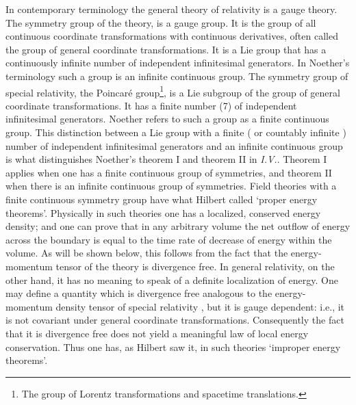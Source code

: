 \documentclass[12pt]{article}
\begin{document}
In contemporary terminology the general theory of relativity is a gauge theory.
The symmetry group of the theory, is a gauge group. It is the group of all continuous coordinate 
transformations with continuous derivatives,   often called
the group of general coordinate transformations. 
   It is a Lie group that has a continuously infinite number of independent infinitesimal generators. In Noether's terminology  such a group is an infinite continuous group.
The symmetry group of special relativity,  the Poincar\'{e} group\footnote{
The group of Lorentz transformations and spacetime translations.}, 
 is a Lie subgroup of the group of general coordinate transformations.  It
 has a finite number (7) of independent infinitesimal
generators. Noether refers to such a  group as a finite continuous group.
This distinction between a Lie group with a finite ( or countably infinite ) number of independent infinitesimal generators and an infinite continuous
group is what distinguishes Noether's theorem I and theorem II  in {\it{I.V.}}.
Theorem I applies when one has a finite continuous  group of symmetries,
and theorem II  when there is an infinite continuous group of
symmetries. Field theories with a finite continuous symmetry group have what
Hilbert called `proper energy theorems'. Physically in such
theories one has a localized, conserved energy density; and 
one can prove that in any arbitrary volume the net outflow of energy 
across the boundary is
equal to the time rate of decrease of energy within the volume. As will
be shown below, this follows from the fact that the energy-momentum tensor
of the theory is divergence free. In general relativity,
on the other hand, it has no meaning to speak of a definite localization of
energy.   One may define a quantity which is divergence free analogous to the energy-momentum density tensor of special relativity , but it  is gauge dependent: i.e., it is not covariant under general coordinate transformations. 
Consequently the fact that it
is divergence free does not yield a meaningful law of local energy conservation.
Thus one has, as Hilbert saw it, in such theories `improper
energy theorems'.
\end{document}
